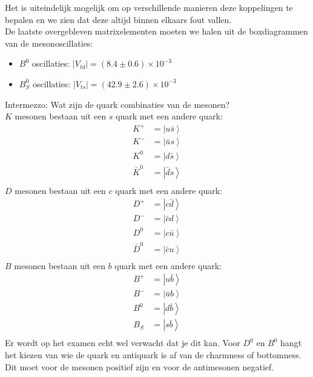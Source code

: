 \documentclass[../main.tex]{subfiles}
\begin{document}
Het is uiteindelijk mogelijk om op verschillende manieren deze koppelingen te bepalen en we zien dat deze altijd binnen elkaars fout vallen.\\
De laatste overgebleven matrixelementen moeten we halen uit de boxdiagrammen van de mesonoscillaties:
\begin{itemize}
    \item $B^0$ oscillaties: $\left|V_{t d}\right|=(8.4 \pm 0.6) \times 10^{-3}$
    \item $B_S^0$ oscillaties: $\left|V_{t s}\right|=(42.9 \pm 2.6) \times 10^{-3}$
\end{itemize}
{\color{blue} Intermezzo: Wat zijn de quark combinaties van de mesonen?\\
    $K$ mesonen bestaan uit een $s$ quark met een andere quark:
    \begin{equation}
        \begin{aligned}
            \label{eq:k_meson_samenstelling}
            K^+ &= \left| u\bar{s}\right>\\
            K^- &= \left| \bar{u}s\right>\\
            K^0 &= \left| d\bar{s}\right>\\
            \bar{K}^0 &= \left| \bar{d}s\right>\\
        \end{aligned}
    \end{equation}
    $D$ mesonen bestaan uit een $c$ quark met een andere quark:
    \begin{equation}
        \begin{aligned}
            \label{eq:d_meson_samenstelling}
            D^+ &= \left| c\bar{d}\right>\\
            D^- &= \left| \bar{c}d\right>\\
            D^0 &= \left| c\bar{u}\right>\\
            \bar{D}^0 &= \left| \bar{c}u\right>\\
        \end{aligned}
    \end{equation}
    $B$ mesonen bestaan uit een $b$ quark met een andere quark:
    \begin{equation}
        \begin{aligned}
            \label{eq:d_meson_samenstelling}
            B^+ &= \left| u\bar{b}\right>\\
            B^- &= \left| \bar{u}b\right>\\
            B^0 &= \left| d\bar{b}\right>\\
            B_S &= \left| s\bar{b}\right>\\
        \end{aligned}
    \end{equation}
    Er wordt op het examen echt wel verwacht dat je dit kan. Voor $D^0$ en $B^0$ hangt het kiezen van wie de quark en antiquark is af van de charmness of bottomness. Dit moet voor de mesonen positief zijn en voor de antimesonen negatief.
}
\end{document}

